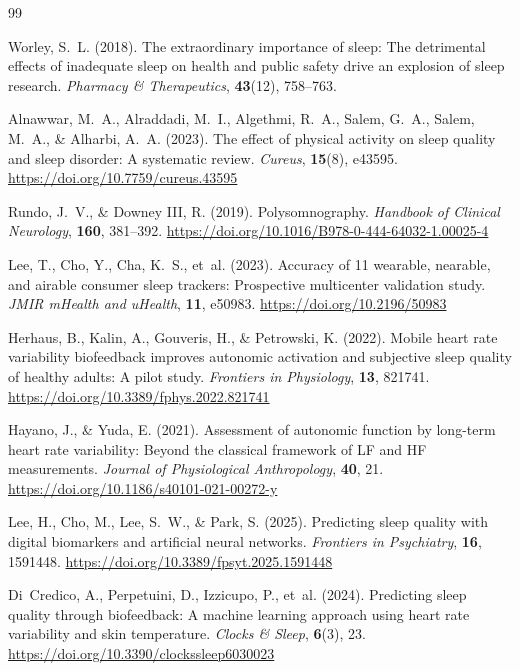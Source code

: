 \documentclass[fleqn,10pt]{wlscirep}
\begin{document}
\begin{thebibliography}{99}

Worley, S.~L. (2018). The extraordinary importance of sleep: The detrimental effects of inadequate sleep on health and public safety drive an explosion of sleep research. \textit{Pharmacy \& Therapeutics}, \textbf{43}(12), 758--763.

Alnawwar, M.~A., Alraddadi, M.~I., Algethmi, R.~A., Salem, G.~A., Salem, M.~A., \& Alharbi, A.~A. (2023). The effect of physical activity on sleep quality and sleep disorder: A systematic review. \textit{Cureus}, \textbf{15}(8), e43595. \url{https://doi.org/10.7759/cureus.43595}

Rundo, J.~V., \& Downey III, R. (2019). Polysomnography. \textit{Handbook of Clinical Neurology}, \textbf{160}, 381--392. \url{https://doi.org/10.1016/B978-0-444-64032-1.00025-4}

Lee, T., Cho, Y., Cha, K.~S., et~al. (2023). Accuracy of 11 wearable, nearable, and airable consumer sleep trackers: Prospective multicenter validation study. \textit{JMIR mHealth and uHealth}, \textbf{11}, e50983. \url{https://doi.org/10.2196/50983}

Herhaus, B., Kalin, A., Gouveris, H., \& Petrowski, K. (2022). Mobile heart rate variability biofeedback improves autonomic activation and subjective sleep quality of healthy adults: A pilot study. \textit{Frontiers in Physiology}, \textbf{13}, 821741. \url{https://doi.org/10.3389/fphys.2022.821741}

Hayano, J., \& Yuda, E. (2021). Assessment of autonomic function by long-term heart rate variability: Beyond the classical framework of LF and HF measurements. \textit{Journal of Physiological Anthropology}, \textbf{40}, 21. \url{https://doi.org/10.1186/s40101-021-00272-y}

Lee, H., Cho, M., Lee, S.~W., \& Park, S. (2025). Predicting sleep quality with digital biomarkers and artificial neural networks. \textit{Frontiers in Psychiatry}, \textbf{16}, 1591448. \url{https://doi.org/10.3389/fpsyt.2025.1591448}

Di~Credico, A., Perpetuini, D., Izzicupo, P., et~al. (2024). Predicting sleep quality through biofeedback: A machine learning approach using heart rate variability and skin temperature. \textit{Clocks \& Sleep}, \textbf{6}(3), 23. \url{https://doi.org/10.3390/clockssleep6030023}


\end{thebibliography}
\end{document}
